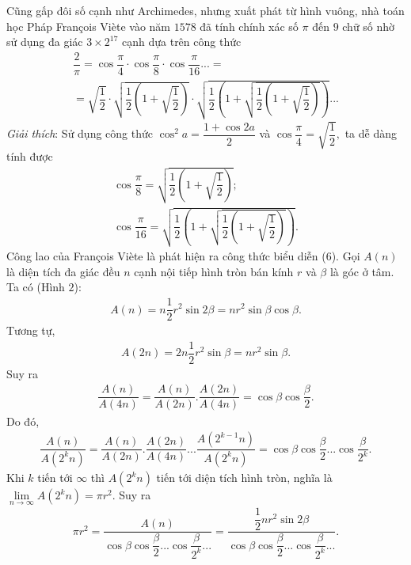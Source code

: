 \begin{multicols}{2}
	\vskip 0.1cm 
	Cũng gấp đôi số cạnh như Archimedes, nhưng xuất phát từ hình vuông, nhà toán học Pháp François Viète vào năm $1578$ đã tính chính xác số $\pi$  đến $9$ chữ số nhờ sử dụng đa giác  $3 \times 2^{17}$ cạnh dựa trên công thức
	\begin{align*}
			\dfrac{2}{\pi } = \cos \dfrac{\pi }{4} \cdot \cos \dfrac{\pi }{8} \cdot \cos \dfrac{\pi }{{16}}... = \\
			= \sqrt {\dfrac{1}{2}}  \cdot \sqrt {\dfrac{1}{2}\left( {1 + \sqrt {\dfrac{1}{2}} } \right)}  \cdot \sqrt {\dfrac{1}{2}\left( {1 + \sqrt {\dfrac{1}{2}\left( {1 + \sqrt {\dfrac{1}{2}} } \right)} } \right)} ... \tag{$6$}
	\end{align*}
	\textit{Giải thích}: Sử dụng công thức ${\cos ^2}a = \dfrac{{1 + \cos 2a}}{2}$  và $\cos \dfrac{\pi }{4} = \sqrt {\dfrac{1}{2}},$ ta dễ dàng tính được 
	\begin{align*}
		\cos \dfrac{\pi }{8} = \sqrt {\dfrac{1}{2}\left( {1 + \sqrt {\dfrac{1}{2}} } \right)};\\
		\cos \dfrac{\pi }{{16}} = \sqrt {\dfrac{1}{2}\left( {1 + \sqrt {\dfrac{1}{2}\left( {1 + \sqrt {\dfrac{1}{2}} } \right)} } \right)}.
	\end{align*}
	Công lao của François Viète là phát hiện ra công thức biểu diễn ($6$).
	\vskip 0.1cm
	Gọi $A(n)$  là diện tích đa giác đều $n$  cạnh nội tiếp hình tròn bán kính  $r$ và $\beta$ là góc ở tâm.  Ta có (Hình $2$):
	\begin{align*}
		A(n) = n\dfrac{1}{2}{r^2}\sin 2\beta  = n{r^2}\sin \beta \cos \beta .
	\end{align*}
	Tương tự,  
	\begin{align*}
		A(2n) = 2n\dfrac{1}{2}{r^2}\sin \beta  = n{r^2}\sin \beta .
	\end{align*}
	Suy ra
	\begin{align*}
		\dfrac{{A(n)}}{{A(4n)}} = \dfrac{{A(n)}}{{A(2n)}}.\dfrac{{A(2n)}}{{A(4n)}} = \cos \beta \cos \dfrac{\beta }{2}.
	\end{align*}
	Do đó,
	\begin{align*}
			\dfrac{{A(n)}}{{A({2^k}n)}} = \dfrac{{A(n)}}{{A(2n)}}.\dfrac{{A(2n)}}{{A(4n)}}...\dfrac{{A\left( {{2^{k - 1}}n} \right)}}{{A({2^k}n)}}= \cos \beta \cos \dfrac{\beta }{2}...\cos \dfrac{\beta }{{{2^k}}}.
	\end{align*}
	Khi $k$  tiến tới $\infty$  thì $A({2^k}n)$  tiến tới diện tích hình tròn, nghĩa là $\mathop {\lim }\limits_{n \to \infty } A({2^k}n) = \pi {r^2}.$ Suy ra  
	\begin{align*}
		\pi {r^2} = \dfrac{{A(n)}}{{\cos \beta \cos \dfrac{\beta }{2}...\cos \dfrac{\beta }{{{2^k}}}...}} = \dfrac{{\dfrac{1}{2}n{r^2}\sin 2\beta }}{{\cos \beta \cos \dfrac{\beta }{2}...\cos \dfrac{\beta }{{{2^k}}}...}}.

\end{align*}
\end{multicols}
